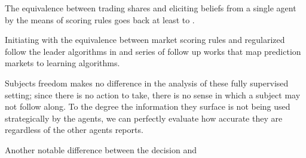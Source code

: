The equivalence between trading shares and eliciting beliefs from a single agent by the means of scoring rules goes back at least to \cite{savage1971elicitation}. 





Initiating with the equivalence between market scoring rules and regularized follow the leader algorithms in \cite{chen2010new} and series of follow up works \cite{abernethy2013efficient, frongillo2012interpreting, hu2014multi, frongillo2015convergence,} that map prediction markets to learning algorithms. 

Subjects freedom makes no difference in the analysis of these fully supervised setting; since there is no action to take, there is no sense in which a subject may not follow along. To the degree the information they surface is not being used strategically by the agents, we can perfectly evaluate how accurate they are regardless of the other agents reports.





Another notable difference between the decision and 




